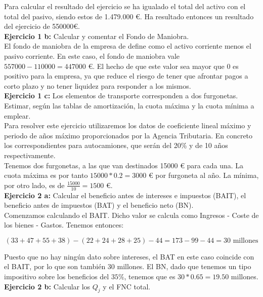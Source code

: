 \documentclass[11pt]{article}
\theoremstyle{plain}
\theoremstyle{definition}
\begin{document}
Para calcular el resultado del ejercicio se ha igualado el total del
activo con el total del pasivo, siendo estos de 1.479.000 €. Ha 
resultado entonces un resultado del ejercicio de 550000€.\\

\textbf{Ejercicio 1 b:} Calcular y comentar el Fondo de Maniobra.\\

El fondo de maniobra de la empresa de define como el activo corriente
menos el pasivo corriente. En este caso, el fondo de maniobra vale
$557000 - 110000 = 447000$ €. El hecho de que este valor sea mayor que 
0 es positivo para la empresa, ya
que reduce el riesgo de tener que afrontar pagos a corto plazo y no
tener liquidez para responder a los mismos.\\

\textbf{Ejercicio 1 c:} Los elementos de transporte corresponden a dos
furgonetas. Estimar, según las tablas de amortización, la cuota máxima
y la cuota mínima a emplear.\\

Para resolver este ejercicio utilizaremos los datos de coeficiente 
lineal máximo y periodo de años máximo proporcionados por la Agencia
Tributaria. En concreto los correspondientes para autocamiones, que serán
del 20\% y de 10 años respectivamente.\\

Tenemos dos furgonetas, a las que van destinados 15000 € para cada una.
La cuota máxima es por tanto $15000 * 0.2 = 3000$ € por furgoneta al
año. La mínima, por otro lado, es de $\frac{15000}{10} = 1500$ €.\\

\textbf{Ejercicio 2 a:} Calcular el beneficio antes de intereses e
impuestos (BAIT), el beneficio antes de impuestos (BAT) y el beneficio
neto (BN).\\

Comenzamos calculando el BAIT. Dicho valor se calcula como Ingresos -
Coste de los bienes - Gastos. Tenemos entonces:

\[
  (33 + 47 + 55 + 38) - (22 + 24 + 28 + 25) - 44 = 173 - 99 - 44 = 30
  \text{ millones}
\]

Puesto que no hay ningún dato sobre intereses, el BAT en este caso 
coincide con el BAIT, por lo que son también 30
millones.  El BN, dado que tenemos un tipo impositivo sobre los
beneficios del $35 \%$, tenemos que es $30 * 0.65 = 19.50$ millones.\\

\textbf{Ejercicio 2 b:} Calcular los $Q_j$ y el FNC total.\\
\end{document}
